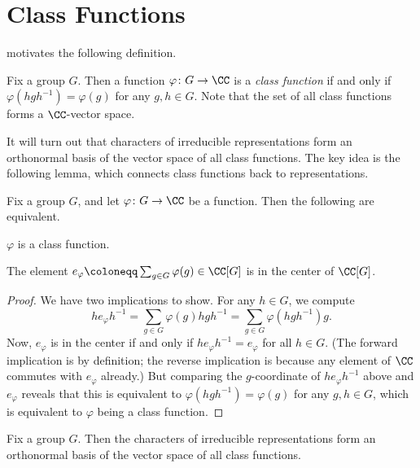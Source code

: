 \documentclass[../main.tex]{subfiles}
\begin{document}
\section{Class Functions}
 motivates the following definition.
\begin{definition}
	Fix a group $G$. Then a function $\varphi\colon G\to\CC$ is a \textit{class function} if and only if $\varphi\left(hgh^{-1}\right)=\varphi(g)$ for any $g,h\in G$. Note that the set of all class functions forms a $\CC$-vector space.
\end{definition}
It will turn out that characters of irreducible representations form an orthonormal basis of the vector space of all class functions. The key idea is the following lemma, which connects class functions back to representations.
\begin{lemma} \label{lem:class-function-is-center}
	Fix a group $G$, and let $\varphi\colon G\to\CC$ be a function. Then the following are equivalent.
	\begin{listalph}
		\item $\varphi$ is a class function.
		\item The element $e_\varphi\coloneqq\sum_{g\in G}\varphi(g)\in\CC[G]$ is in the center of $\CC[G]$.
	\end{listalph}
\end{lemma}
\begin{proof}
	We have two implications to show. For any $h\in G$, we compute
	\[he_\varphi h^{-1}=\sum_{g\in G}\varphi(g)hgh^{-1}=\sum_{g\in G}\varphi\left(hgh^{-1}\right)g.\]
	Now, $e_\varphi$ is in the center if and only if $he_\varphi h^{-1}=e_\varphi$ for all $h\in G$. (The forward implication is by definition; the reverse implication is because any element of $\CC$ commutes with $e_\varphi$ already.) But comparing the $g$-coordinate of $he_\varphi h^{-1}$ above and $e_\varphi$ reveals that this is equivalent to $\varphi\left(hgh^{-1}\right)=\varphi(g)$ for any $g,h\in G$, which is equivalent to $\varphi$ being a class function.
\end{proof}
\begin{proposition} \label{prop:irrep-chars-span-class-funcs}
	Fix a group $G$. Then the characters of irreducible representations form an orthonormal basis of the vector space of all class functions.
\end{proposition}
\end{document}
